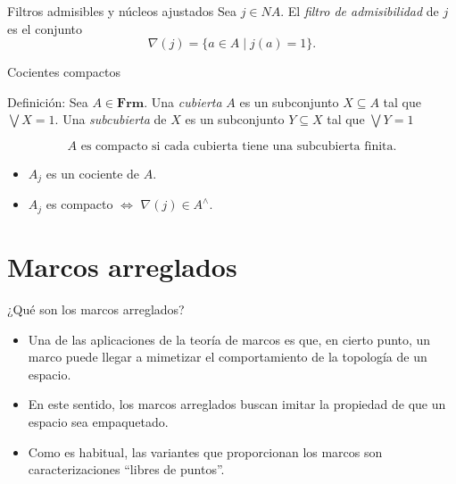 \documentclass[compress,12pt]{beamer}
\begin{document}
\begin{frame}{Filtros admisibles y núcleos ajustados}
    Sea $j\in NA$. El \emph{filtro de admisibilidad} de $j$ es el conjunto
    \[
    \nabla(j)=\{a\in A\mid j(a)=1\}.
    \]
\end{frame}

\begin{frame}{Cocientes compactos}
\begin{block}{Definición:}
Sea $A\in \mathbf{Frm}$. Una \emph{cubierta} $A$ es un subconjunto $X\subseteq A$ tal que $\bigvee X=1$. Una \emph{subcubierta} de $X$ es un subconjunto $Y\subseteq X$ tal que $\bigvee Y=1$
\end{block}
\[ 
A \mbox{ es compacto si cada cubierta tiene una subcubierta finita.}
\]

\begin{itemize}
    \item<3-> $A_j$ es un cociente de $A$.
    \item<4-> $A_j$ es compacto $\Leftrightarrow$ $\nabla(j)\in A^\wedge$.
\end{itemize}
\end{frame}

\section{Marcos arreglados}
\begin{frame}{¿Qué son los marcos arreglados?}
    \begin{itemize}

    \item Una de las aplicaciones de la teoría de marcos es que, en cierto punto, un marco puede llegar a mimetizar el comportamiento de la topología de un espacio.\\

    \item En este sentido, los marcos arreglados buscan imitar la propiedad de que un espacio sea empaquetado.\\

    \item Como es habitual, las variantes que proporcionan los marcos son caracterizaciones ``libres de puntos''.
    \end{itemize}
\end{frame}
\end{document}
